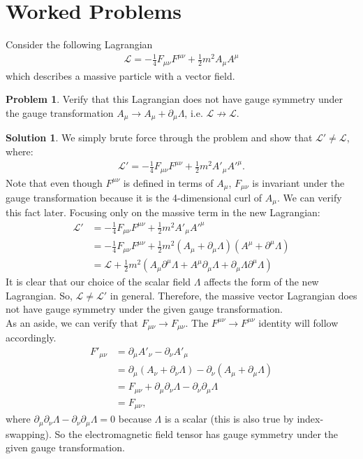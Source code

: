 \documentclass[a4paper,11pt]{article}
\numberwithin{equation}{section}
\theoremstyle{definition}
\newtheorem{prob}{Problem}[section]
\newtheorem{sln}{Solution}[section]
\newcommand{\p}{\partial}
\newcommand{\lag}{\mathcal{L}}
\begin{document}
\section{Worked Problems}
Consider the following Lagrangian
\begin{align*}
\lag = -\frac{1}{4}F_{\mu\nu}F^{\mu\nu} + \frac{1}{2}m^2 A_\mu A^\mu
\end{align*}
which describes a massive particle with a vector field.\\
\begin{prob}
	Verify that this Lagrangian does not have gauge symmetry under the gauge transformation $A_\mu \to A_\mu +\p_\mu \Lambda$, i.e. $\lag \not\to \lag$.\\
	\begin{sln}
		We simply brute force through the problem and show that $\lag' \neq \lag$, where:
		\begin{align*}
		\lag' = -\frac{1}{4}F_{\mu\nu}F^{\mu\nu} + \frac{1}{2}m^2 A'_\mu A'^\mu.
		\end{align*}
		Note that even though $F^{\mu\nu}$ is defined in terms of $A_\mu$, $F_{\mu\nu}$ is invariant under the gauge transformation because it is the 4-dimensional curl of $A_\mu$. We can verify this fact later. Focusing only on the massive term in the new Lagrangian:
		\begin{align*}
		\lag' &= -\frac{1}{4}F_{\mu\nu}F^{\mu\nu} + \frac{1}{2}m^2 A'_\mu A'^\mu\\
		&= -\frac{1}{4}F_{\mu\nu}F^{\mu\nu} +\frac{1}{2}m^2(A_\mu + \p_\mu \Lambda)(A^\mu + \p^\mu \Lambda)\\
		&= \lag + \frac{1}{2}m^2(A_\mu \p^\mu\Lambda + A^\mu \p_\mu \Lambda + \p_\mu\Lambda \p^\mu \Lambda)
		\end{align*}
		It is clear that our choice of the scalar field $\Lambda$ affects the form of the new Lagrangian. So, $\lag \neq \lag'$ in general. Therefore, the massive vector Lagrangian does not have gauge symmetry under the given gauge transformation.\\
		
		As an aside, we can verify that $F_{\mu\nu}\to F_{\mu\nu}$. The $F^{\mu\nu} \to F^{\mu\nu}$ identity will follow accordingly. 
		\begin{align*}
		F'_{\mu\nu} &= \p_\mu A'_\nu - \p_\nu A'_\mu\\
		&= \p_\mu(A_\nu + \p_\nu\Lambda) - \p_\nu(A_\mu + \p_\mu\Lambda)\\
		&= F_{\mu\nu} + \p_\mu \p_\nu \Lambda - \p_\nu \p_\mu\Lambda\\
		&= F_{\mu\nu},
		\end{align*}
		where $\p_\mu \p_\nu \Lambda - \p_\nu \p_\mu\Lambda=0$ because $\Lambda$ is a scalar (this is also true by index-swapping). So the electromagnetic field tensor has gauge symmetry under the given gauge transformation. \\
	\end{sln}
\end{prob}
\end{document}
